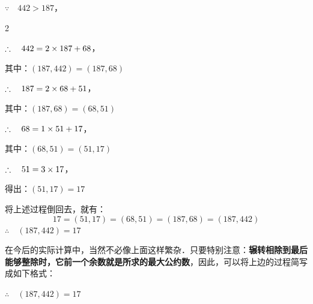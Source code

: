 \begin{solution}
$\because\quad 442>187$，

\begin{multicols}{2}
  \begin{center}
  \end{center}  

$\therefore\quad 442=2\times 187+68$，

其中：$(187,442)=(187,68)$

\begin{center}
\end{center}

$\therefore\quad 187=2\times 68+51$，

其中：$(187,68)=(68,51)$

\begin{center}
\end{center}

$\therefore\quad 68=1\times 51+17$，

其中：$(68,51)=(51,17)$

\begin{center}
\end{center}

$\therefore\quad 51=3\times 17$，

得出：$(51,17)=17$
\end{multicols}

将上述过程倒回去，就有：
\[17= (51, 17) = (68, 51) = (187, 68) = (187, 442)\] 
$\therefore\quad  (187, 442) =17$
\end{solution}


在今后的实际计算中，当然不必像上面这样繁杂．只要特别注意：\textbf{辗转相除到最后能够整除时，它前一个余数就是所求的最大公约数}，因此，可以将上边的过程简写成如下格式：
\begin{center}
\end{center}
$\therefore\quad (187,442)=17$



